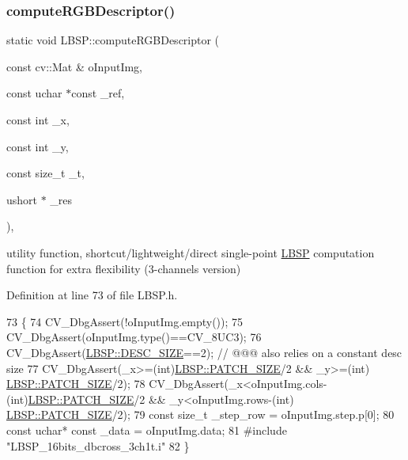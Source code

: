 \subsubsection{\texorpdfstring{compute\+R\+G\+B\+Descriptor()}{computeRGBDescriptor()}\hspace{0.1cm}{\footnotesize\ttfamily [2/2]}}
{\footnotesize\ttfamily static void L\+B\+S\+P\+::compute\+R\+G\+B\+Descriptor (\begin{DoxyParamCaption}\item[{const cv\+::\+Mat \&}]{o\+Input\+Img,  }\item[{const uchar $\ast$const}]{\+\_\+ref,  }\item[{const int}]{\+\_\+x,  }\item[{const int}]{\+\_\+y,  }\item[{const size\+\_\+t}]{\+\_\+t,  }\item[{ushort $\ast$}]{\+\_\+res }\end{DoxyParamCaption})\hspace{0.3cm}{\ttfamily [inline]}, {\ttfamily [static]}}



utility function, shortcut/lightweight/direct single-\/point \mbox{\hyperlink{class_l_b_s_p}{L\+B\+SP}} computation function for extra flexibility (3-\/channels version) 



Definition at line 73 of file L\+B\+S\+P.\+h.


\begin{DoxyCode}
73                                                                                                            
                                                    \{
74         CV\_DbgAssert(!oInputImg.empty());
75         CV\_DbgAssert(oInputImg.type()==CV\_8UC3);
76         CV\_DbgAssert(\mbox{\hyperlink{class_l_b_s_p_a11167130ddc713921e5bbb0b628d5f74}{LBSP::DESC\_SIZE}}==2); \textcolor{comment}{// @@@ also relies on a constant desc size}
77         CV\_DbgAssert(\_x>=(\textcolor{keywordtype}{int})\mbox{\hyperlink{class_l_b_s_p_aa98abb79a155d3a2b416c2ab32e74929}{LBSP::PATCH\_SIZE}}/2 && \_y>=(\textcolor{keywordtype}{int})
      \mbox{\hyperlink{class_l_b_s_p_aa98abb79a155d3a2b416c2ab32e74929}{LBSP::PATCH\_SIZE}}/2);
78         CV\_DbgAssert(\_x<oInputImg.cols-(\textcolor{keywordtype}{int})\mbox{\hyperlink{class_l_b_s_p_aa98abb79a155d3a2b416c2ab32e74929}{LBSP::PATCH\_SIZE}}/2 && \_y<oInputImg.rows-(\textcolor{keywordtype}{int})
      \mbox{\hyperlink{class_l_b_s_p_aa98abb79a155d3a2b416c2ab32e74929}{LBSP::PATCH\_SIZE}}/2);
79         \textcolor{keyword}{const} \textcolor{keywordtype}{size\_t} \_step\_row = oInputImg.step.p[0];
80         \textcolor{keyword}{const} uchar* \textcolor{keyword}{const} \_data = oInputImg.data;
81 \textcolor{preprocessor}{        #include "LBSP\_16bits\_dbcross\_3ch1t.i"}
82     \}
\end{DoxyCode}
\mbox{\label{class_l_b_s_p_a35f2abfacc0d540810d678ff5e8cd619}} 
